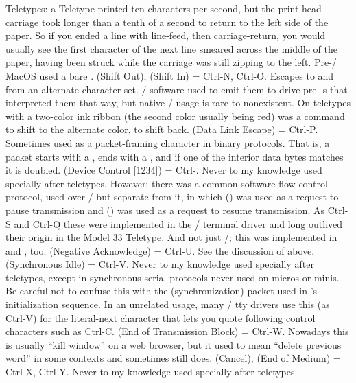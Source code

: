 Teletypes: a Teletype printed ten characters per second, but the print-head
carriage took longer than a tenth of a second to return to the left side of the
paper. So if you ended a line with line-feed, then carriage-return, you would
usually see the first character of the next line smeared across the middle of
the paper, having been struck while the carriage was still zipping to the left.
Pre-\UNIX/ MacOS used a bare .
\dlist {} (Shift Out),  (Shift In) = Ctrl-N, Ctrl-O.
Escapes to and from an alternate character set. \UNIX/ software used to emit them
to drive pre- s that interpreted them that way, but native \UNIX/ usage is
rare to nonexistent. On teletypes with a two-color ink ribbon (the second color
usually being red)  was a command to shift to the alternate color,  to
shift back.
\dlist {} (Data Link Escape) = Ctrl-P.
Sometimes used as a packet-framing character in binary protocols. That is, a
packet starts with a , ends with a , and if one of the interior data
bytes matches  it is doubled.
\dlist {} (Device Control [1234]) = Ctrl-\acro{[QRST]}.
Never to my knowledge used specially after teletypes. However: there was a
common software flow-control protocol, used over \ASCII/ but separate from it, in
which  () was used as a request to pause transmission and  () was
used as a request to resume transmission. As Ctrl-S and Ctrl-Q these were
implemented in the \UNIX/ terminal driver and long outlived their origin in the
Model 33 Teletype. And not just \UNIX/; this was implemented in  and ,
too.
\dlist {} (Negative Acknowledge) = Ctrl-U. See the discussion of  above.
\dlist {} (Synchronous Idle) = Ctrl-V.
Never to my knowledge used specially after teletypes, except in synchronous
serial protocols never used on micros or minis. Be careful not to confuse this
with the  (synchronization) packet used in 's  
initialization sequence. In an unrelated usage, many \UNIX/ tty drivers use this
(as Ctrl-V) for the literal-next character that lets you quote following
control characters such as Ctrl-C.
\dlist {} (End of Transmission Block) = Ctrl-W.
Nowadays this is usually ``kill window'' on a web browser, but it used to mean
``delete previous word'' in some contexts and sometimes still does.
\dlist {} (Cancel),  (End of Medium) = Ctrl-X, Ctrl-Y.
Never to my knowledge used specially after teletypes.
